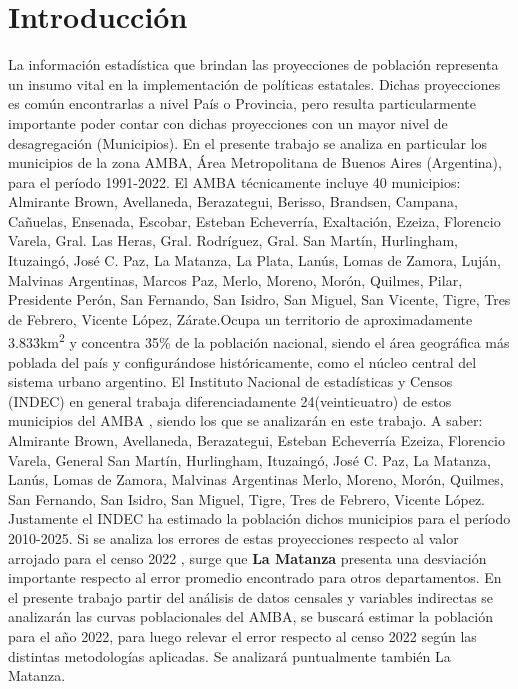 \documentclass{article}
\theoremstyle{mytheoremstyle}
\theoremstyle{mytheoremstyle}
\theoremstyle{myproblemstyle}
\begin{document}
\section{Introducción}
La información estadística que brindan las proyecciones de población representa un insumo vital en la implementación de 
políticas estatales. Dichas proyecciones es común encontrarlas a nivel País o Provincia, 
pero resulta particularmente importante poder contar con dichas proyecciones con un mayor nivel de desagregación (Municipios).
En el presente trabajo se analiza en particular los municipios de la zona AMBA, Área Metropolitana de Buenos Aires (Argentina),
 para el período 1991-2022. El AMBA técnicamente incluye 40 municipios: Almirante Brown, Avellaneda, Berazategui, Berisso, 
 Brandsen, Campana, Cañuelas, Ensenada, Escobar, Esteban Echeverría, Exaltación, Ezeiza, 
 Florencio Varela, Gral. Las Heras, Gral. Rodríguez, Gral. San Martín, Hurlingham, Ituzaingó, José C. Paz, 
 La Matanza, La Plata, Lanús, Lomas de Zamora, Luján, Malvinas Argentinas, Marcos Paz, Merlo, Moreno, Morón, 
 Quilmes, Pilar, Presidente Perón, San Fernando, San Isidro, San Miguel, San Vicente, Tigre, Tres de Febrero, 
 Vicente López, Zárate.Ocupa un territorio de aproximadamente 3.833\textup{km\textsuperscript{2}} y concentra 35\% de la población nacional, 
 siendo el área geográfica más poblada del país y configurándose históricamente, 
 como el núcleo central del sistema urbano argentino.\newline
 El Instituto Nacional de estadísticas y Censos (INDEC) en general trabaja diferenciadamente 24(veinticuatro) de estos municipios del AMBA ,
 siendo los que se analizarán en este trabajo. A saber: Almirante Brown, Avellaneda, Berazategui, Esteban Echeverría
 Ezeiza, Florencio Varela, General San Martín, Hurlingham, Ituzaingó, José C. Paz, La Matanza, Lanús, Lomas de Zamora, Malvinas Argentinas
 Merlo, Moreno, Morón, Quilmes, San Fernando, San Isidro, San Miguel, Tigre, Tres de Febrero, Vicente López.\newline
 Justamente el INDEC ha estimado la población dichos municipios para el período 2010-2025.
 Si se analiza los errores de estas proyecciones respecto al valor arrojado para el censo 2022 , surge 
 que \textbf{La Matanza} presenta una desviación importante respecto
al error promedio encontrado para otros departamentos.\newline 
 En el presente trabajo partir del análisis de datos censales y variables indirectas se analizarán las curvas poblacionales del AMBA,
 se buscará estimar la población para el año 2022, para luego relevar el error respecto al censo 2022 según 
 las distintas metodologías aplicadas. Se analizará puntualmente también La Matanza.
\end{document}
